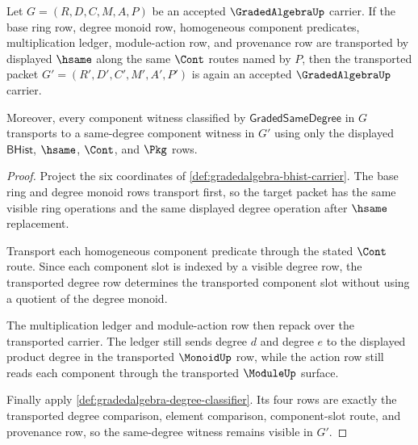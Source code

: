 \begin{theorem}
\label{thm:gradedalgebra-component-stability}
Let $G=(R,D,C,M,A,P)$ be an accepted $\GradedAlgebraUp$ carrier. If the base ring row, degree monoid row, homogeneous component predicates, multiplication ledger, module-action row, and provenance row are transported by displayed $\hsame$ along the same $\Cont$ routes named by $P$, then the transported packet $G'=(R',D',C',M',A',P')$ is again an accepted $\GradedAlgebraUp$ carrier.

Moreover, every component witness classified by $\mathsf{GradedSameDegree}$ in $G$ transports to a same-degree component witness in $G'$ using only the displayed $\mathsf{BHist}$, $\hsame$, $\Cont$, and $\Pkg$ rows.
\end{theorem}
\begin{proof}
Project the six coordinates of \autoref{def:gradedalgebra-bhist-carrier}. The base ring and degree monoid rows transport first, so the target packet has the same visible ring operations and the same displayed degree operation after $\hsame$ replacement.

Transport each homogeneous component predicate through the stated $\Cont$ route. Since each component slot is indexed by a visible degree row, the transported degree row determines the transported component slot without using a quotient of the degree monoid.

The multiplication ledger and module-action row then repack over the transported carrier. The ledger still sends degree $d$ and degree $e$ to the displayed product degree in the transported $\MonoidUp$ row, while the action row still reads each component through the transported $\ModuleUp$ surface.

Finally apply \autoref{def:gradedalgebra-degree-classifier}. Its four rows are exactly the transported degree comparison, element comparison, component-slot route, and provenance row, so the same-degree witness remains visible in $G'$.
\end{proof}

